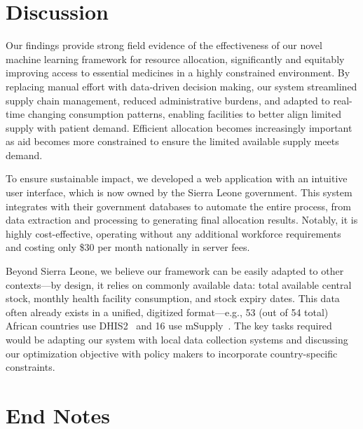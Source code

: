 \documentclass[12pt]{article}
\begin{document}
\section{Discussion}

Our findings provide strong field evidence of the effectiveness of our novel machine learning framework for resource allocation, significantly and equitably improving access to essential medicines in a highly constrained environment. By replacing manual effort with data-driven decision making, our system streamlined supply chain management, reduced administrative burdens, and adapted to real-time changing consumption patterns, enabling facilities to better align limited supply with patient demand. Efficient allocation becomes increasingly important as aid becomes more constrained to ensure the limited available supply meets demand.

To ensure sustainable impact, we developed a web application with an intuitive user interface, which is now owned by the Sierra Leone government. This system integrates with their government databases to automate the entire process, from data extraction and processing to generating final allocation results. Notably, it is highly cost-effective, operating without any additional workforce requirements and costing only \$30 per month nationally in server fees.

Beyond Sierra Leone, we believe our framework can be easily adapted to other contexts---by design, it relies on commonly available data: total available central stock, monthly health facility consumption, and stock expiry dates. This data often already exists in a unified, digitized format---e.g., 53 (out of 54 total) African countries use DHIS2~\cite{dhis2} and 16 use mSupply~\cite{mSupply}. The key tasks required would be adapting our system with local data collection systems and discussing our optimization objective with policy makers to incorporate country-specific constraints.







\section*{End Notes}
\end{document}
